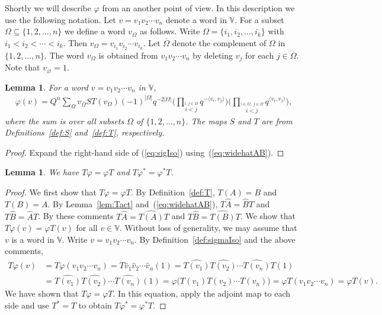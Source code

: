 \documentclass[pdftex]{sigma}
\numberwithin{equation}{section}
\newtheorem{Lemma}[Theorem]{Lemma}
\begin{document}
Shortly we will describe $\varphi$ from an another point of view. In this description we use the following notation. Let $v=v_1v_2\cdots v_n$ denote a word in $\mathbb V$. For a subset $\Omega \subseteq \lbrace 1,2,\ldots, n\rbrace$ we define a word $v_\Omega$ as follows. Write $\Omega = \lbrace i_1,i_2,\ldots, i_k\rbrace $ with $i_1 < i_2 < \cdots < i_k$. Then $v_\Omega = v_{i_1} v_{i_2} \cdots v_{i_k}$. Let $\overline \Omega$ denote the complement of $\Omega$ in $\lbrace 1,2,\ldots, n\rbrace$.
The word $v_{\Omega}$ is obtained from $v_1v_2\cdots v_n$ by deleting $v_j$ for each $j \in \overline \Omega$. Note that $v_\varnothing = 1$.

\begin{Lemma} For a word $v=v_1v_2\cdots v_n$ in $\mathbb V$,
\begin{gather*}
\varphi(v) = Q^n \sum_{\Omega}
v_{\overline \Omega} ST(v_\Omega) (-1)^{|\Omega|} q^{-2|\Omega|}
\Biggl(
\prod_{\stackrel{i,j\in \Omega}{i<j}} q^{-\langle v_i,v_j\rangle}
\Biggr)
\Biggl(
\prod_{\stackrel{i\in \Omega, \;j\in \overline \Omega}
{i<j}} q^{\langle v_i,v_j\rangle}
\Biggr),
\end{gather*}
where the sum is over all subsets $\Omega $ of $\lbrace 1,2,\ldots, n\rbrace$. The maps $S$ and $T$ are from
Definitions~{\rm \ref{def:S}} and~{\rm \ref{def:T}}, respectively.
\end{Lemma}

\begin{proof} Expand the right-hand side of (\ref{eq:sigIso}) using~(\ref{eq:widehatAB}).
\end{proof}

\begin{Lemma}\label{lem:TT} We have $ T \varphi = \varphi T$ and $ T \varphi^* = \varphi^* T$.
\end{Lemma}
\begin{proof}We first show that $ T \varphi = \varphi T$. By Definition~\ref{def:T}, $T(A)=B$ and $T(B)=A$.
By Lemma~\ref{lem:Tact} and~(\ref{eq:widehatAB}), $T \widehat A = \widehat B T$ and $T \widehat B = \widehat A T$. By these comments $T \widehat A = \widehat {T(A)} T$ and $T \widehat B = \widehat {T(B)} T$.
We show that $ T \varphi (v) = \varphi T (v)$ for all $v \in \mathbb V$. Without loss of generality,
we may assume that $v$ is a word in $\mathbb V$. Write $v=v_1v_2\cdots v_n$. By Definition~\ref{def:sigmaIso} and the above comments,
\begin{align*}
T \varphi (v) &= T \varphi (v_1v_2\cdots v_n) =T \widehat v_1 \widehat v_2\cdots \widehat v_n (1)=
 \widehat {T(v_1)} \widehat {T(v_2)}\cdots \widehat {T(v_n)} T (1) \\
& = \widehat {T(v_1)} \widehat {T(v_2)}\cdots \widehat {T(v_n)} (1)=\varphi \bigl(T(v_1) T(v_2)\cdots T(v_n)\bigr)=\varphi T (v_1v_2\cdots v_n) =\varphi T (v).
\end{align*}
We have shown that $ T \varphi = \varphi T$. In this equation, apply the adjoint map to each side and
use $T^*=T$ to obtain $ T \varphi^* = \varphi^* T$.
\end{proof}
\end{document}
